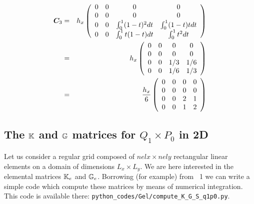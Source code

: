 \begin{eqnarray}
{\bm C}_3 
&=&
h_x
\left(
\begin{array}{cccc}
0 & 0 & 0 & 0 \\
0 & 0 & 0 & 0 \\ 
0 & 0 & \int_{0}^1 (1-t)^2 dt & \int_{0}^1 (1-t)t  dt \\
0 & 0 & \int_{0}^1 t(1-t) dt & \int_{0}^1 t^2 dt 
\end{array}
\right) \nonumber\\
&=& 
h_x
\left(
\begin{array}{cccc}
0 & 0 & 0 & 0 \\ 
0 & 0 & 0 & 0  \\
0 & 0 & 1/3 & 1/6 \\
0 & 0 & 1/6 & 1/3 
\end{array}
\right) \nonumber\\
&=& 
\frac{h_x}{6}
\left(
\begin{array}{cccc}
0 & 0 & 0 & 0 \\ 
0 & 0 & 0 & 0  \\
0 & 0 & 2 & 1 \\
0 & 0 & 1 & 2 
\end{array}
\right) 
\end{eqnarray}



\subsection{The ${\mathbb{K}}$ and ${\mathbb{G}}$ matrices for $Q_1 \times P_0$ in 2D \label{app:q1p0_elmats}}

Let us consider a regular grid composed of $nelx \times nely$ rectangular linear 
elements on a domain of dimensions $L_x\times L_y$. We are here interested in the 
elemental matrices ${\mathbb{K}}_e$ and ${\mathbb{G}}_e$. Borrowing (for example) from \stone~1 we can write 
a simple code which compute these matrices by means of numerical integration. 
This code is available there: {\tt python\_codes/Gel/compute\_K\_G\_S\_q1p0.py}.

